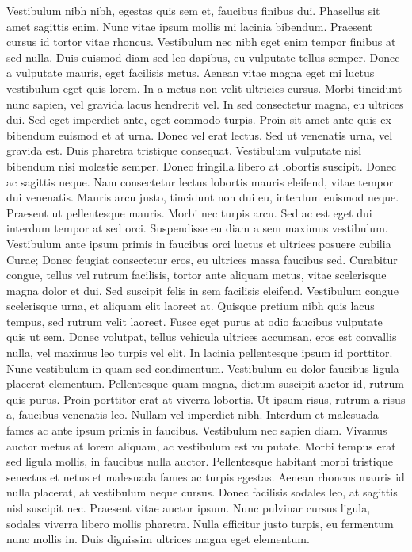 \documentclass[a4paper,11pt,twoside]{book}
\begin{document}
Vestibulum nibh nibh, egestas quis sem et, faucibus finibus dui. Phasellus sit amet sagittis enim. Nunc vitae ipsum mollis mi lacinia bibendum. Praesent cursus id tortor vitae rhoncus. Vestibulum nec nibh eget enim tempor finibus at sed nulla. Duis euismod diam sed leo dapibus, eu vulputate tellus semper. Donec a vulputate mauris, eget facilisis metus. Aenean vitae magna eget mi luctus vestibulum eget quis lorem. In a metus non velit ultricies cursus. Morbi tincidunt nunc sapien, vel gravida lacus hendrerit vel. In sed consectetur magna, eu ultrices dui. Sed eget imperdiet ante, eget commodo turpis. Proin sit amet ante quis ex bibendum euismod et at urna.
Donec vel erat lectus. Sed ut venenatis urna, vel gravida est. Duis pharetra tristique consequat. Vestibulum vulputate nisl bibendum nisi molestie semper. Donec fringilla libero at lobortis suscipit. Donec ac sagittis neque. Nam consectetur lectus lobortis mauris eleifend, vitae tempor dui venenatis. Mauris arcu justo, tincidunt non dui eu, interdum euismod neque. Praesent ut pellentesque mauris. Morbi nec turpis arcu. Sed ac est eget dui interdum tempor at sed orci. Suspendisse eu diam a sem maximus vestibulum.
Vestibulum ante ipsum primis in faucibus orci luctus et ultrices posuere cubilia Curae; Donec feugiat consectetur eros, eu ultrices massa faucibus sed. Curabitur congue, tellus vel rutrum facilisis, tortor ante aliquam metus, vitae scelerisque magna dolor et dui. Sed suscipit felis in sem facilisis eleifend. Vestibulum congue scelerisque urna, et aliquam elit laoreet at. Quisque pretium nibh quis lacus tempus, sed rutrum velit laoreet. Fusce eget purus at odio faucibus vulputate quis ut sem. Donec volutpat, tellus vehicula ultrices accumsan, eros est convallis nulla, vel maximus leo turpis vel elit. In lacinia pellentesque ipsum id porttitor. Nunc vestibulum in quam sed condimentum. Vestibulum eu dolor faucibus ligula placerat elementum.
Pellentesque quam magna, dictum suscipit auctor id, rutrum quis purus. Proin porttitor erat at viverra lobortis. Ut ipsum risus, rutrum a risus a, faucibus venenatis leo. Nullam vel imperdiet nibh. Interdum et malesuada fames ac ante ipsum primis in faucibus. Vestibulum nec sapien diam. Vivamus auctor metus at lorem aliquam, ac vestibulum est vulputate. Morbi tempus erat sed ligula mollis, in faucibus nulla auctor.
Pellentesque habitant morbi tristique senectus et netus et malesuada fames ac turpis egestas. Aenean rhoncus mauris id nulla placerat, at vestibulum neque cursus. Donec facilisis sodales leo, at sagittis nisl suscipit nec. Praesent vitae auctor ipsum. Nunc pulvinar cursus ligula, sodales viverra libero mollis pharetra. Nulla efficitur justo turpis, eu fermentum nunc mollis in. Duis dignissim ultrices magna eget elementum.
\end{document}
